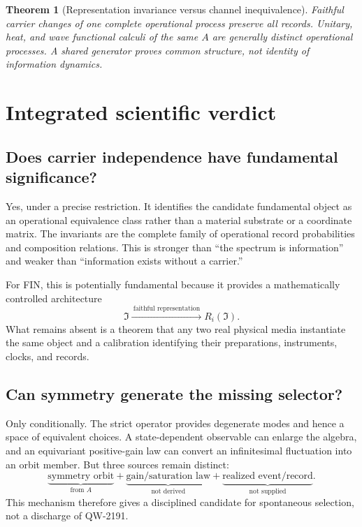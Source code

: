 \documentclass[11pt,a4paper]{article}
\newtheorem{theorem}{Theorem}[section]
\begin{document}
\begin{theorem}[Representation invariance versus channel inequivalence]
Faithful carrier changes of one complete operational process preserve all records. Unitary, heat, and wave functional calculi of the same $A$ are generally distinct operational processes. A shared generator proves common structure, not identity of information dynamics.
\end{theorem}

\section{Integrated scientific verdict}

\subsection{Does carrier independence have fundamental significance?}

Yes, under a precise restriction. It identifies the candidate fundamental object as an operational equivalence class rather than a material substrate or a coordinate matrix. The invariants are the complete family of operational record probabilities and composition relations. This is stronger than ``the spectrum is information'' and weaker than ``information exists without a carrier.''

For FIN, this is potentially fundamental because it provides a mathematically controlled architecture
\[
\mathfrak I
\xrightarrow{\ \text{faithful representation}\ }
R_i(\mathfrak I).
\]
What remains absent is a theorem that any two real physical media instantiate the same object and a calibration identifying their preparations, instruments, clocks, and records.

\subsection{Can symmetry generate the missing selector?}

Only conditionally. The strict operator provides degenerate modes and hence a space of equivalent choices. A state-dependent observable can enlarge the algebra, and an equivariant positive-gain law can convert an infinitesimal fluctuation into an orbit member. But three sources remain distinct:
\[
\underbrace{\text{symmetry orbit}}_{\text{from }A}
+\underbrace{\text{gain/saturation law}}_{\text{not derived}}
+\underbrace{\text{realized event/record}}_{\text{not supplied}}.
\]
This mechanism therefore gives a disciplined candidate for spontaneous selection, not a discharge of QW-2191.
\end{document}
